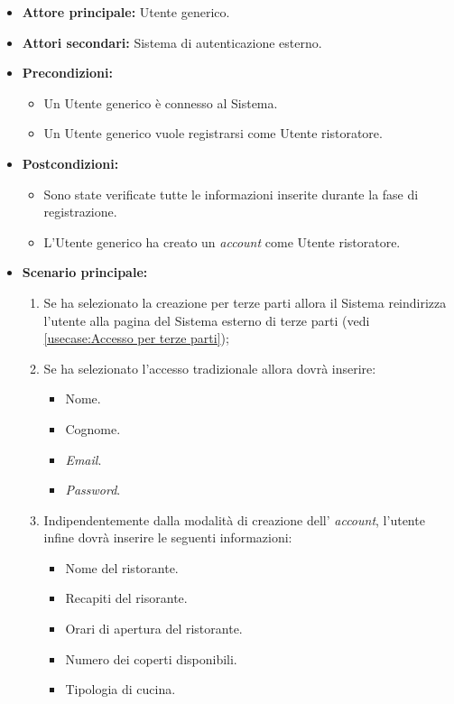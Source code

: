 \label{usecase:Registrazione Utente ristoratore}
\begin{itemize}

	\item \textbf{Attore principale:} Utente generico.
	\item \textbf{Attori secondari:} Sistema di autenticazione esterno. 

	\item \textbf{Precondizioni:} 
	\begin{itemize}
        \item  Un Utente generico è connesso al Sistema.
        \item  Un Utente generico vuole registrarsi come Utente ristoratore.
    \end{itemize}
    

	\item \textbf{Postcondizioni:} 
    \begin{itemize}
        \item  Sono state verificate tutte le informazioni inserite durante la fase di registrazione.
        \item  L'Utente generico ha creato un \textit{account} come Utente ristoratore.
    \end{itemize}

	\item \textbf{Scenario principale:}
	\begin{enumerate}

            \item Se ha selezionato la creazione per terze parti allora il Sistema reindirizza l'utente alla pagina del Sistema esterno di terze parti (vedi \autoref{usecase:Accesso per terze parti});
            \item Se ha selezionato l'accesso tradizionale allora dovrà inserire:
            \begin{itemize}
                \item Nome.
                \item Cognome.
                \item \textit{Email}.
                \item \textit{Password}.
            \end{itemize}

            \item Indipendentemente dalla modalità di creazione dell' \textit{account}, l'utente infine dovrà inserire le seguenti informazioni:
                \begin{itemize}
                    \item Nome del ristorante.
                    \item Recapiti del risorante.
                    \item Orari di apertura del ristorante.
                    \item Numero dei coperti disponibili.
                    \item Tipologia di cucina.
                \end{itemize}
            
	\end{enumerate}
	
\end{itemize}